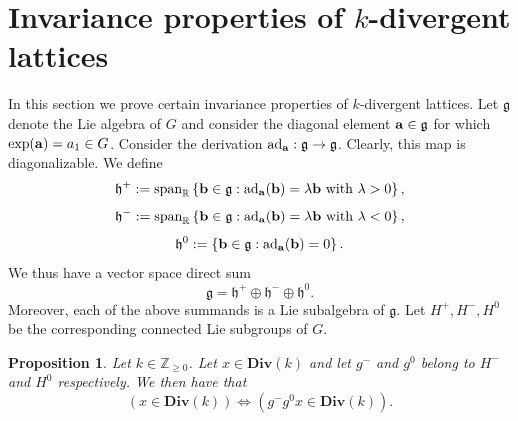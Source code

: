 \documentclass[reqno,11pt]{amsart}
\theoremstyle{plain}
\newtheorem{prop}[thm]{Proposition}
\theoremstyle{definition}
\theoremstyle{remark}
\numberwithin{equation}{section}
\newcommand{\D}{\mathbf{Div}}
\newcommand{\R}{{\mathbb{R}}}
\newcommand{\Z}{{\mathbb{Z}}}
\newcommand{\va}{{\bf a}}
\newcommand{\vb}{{\bf b}}
\begin{document}
\section{Invariance properties of $k$-divergent lattices}
In this section we prove certain invariance properties of $k$-divergent lattices. 
Let $\mathfrak{g}$ denote the Lie algebra of $G$ and consider the diagonal element $\va \in \mathfrak{g}$ for which $\exp(\va) = a_1 \in G$.
Consider the derivation $\text{ad}_\va:\mathfrak{g} \to \mathfrak{g}$. Clearly, this map is diagonalizable. 
We define
\begin{equation}
    \mathfrak{h}^+ := \text{span}_\R\left\lbrace \vb \in \mathfrak{g} : \text{ad}_\va(\vb) = \lambda \vb \text{ with } \lambda >0\right\rbrace,
\end{equation}
\begin{equation}
    \mathfrak{h}^- := \text{span}_\R\left\lbrace \vb \in \mathfrak{g} : \text{ad}_\va(\vb) = \lambda \vb \text{ with } \lambda <0\right\rbrace,
\end{equation}
\begin{equation}
    \mathfrak{h}^0 := \left\lbrace \vb \in \mathfrak{g} : \text{ad}_\va(\vb) = 0\right\rbrace.
\end{equation}
We thus have a vector space direct sum 
\begin{equation*}
    \mathfrak{g} = \mathfrak{h}^+ \oplus \mathfrak{h}^- \oplus \mathfrak{h}^0.
\end{equation*}
Moreover, each of the above summands is a Lie subalgebra of $\mathfrak{g}$.
Let $H^+, H^-, H^0$ be the corresponding connected Lie subgroups of $G$.
\begin{prop}\label{weak-stable-invariance}
Let $k \in \Z_{\geq 0}$. Let $x \in \D(k)$ and let $g^-$ and $g^0$ belong to $H^-$ and $H^0$ respectively.
We then have that
\begin{equation}
    \left(x \in \D(k)\right) \iff \left( g^- g^0 x \in \D(k) \right).
\end{equation}
\end{prop}
\end{document}
